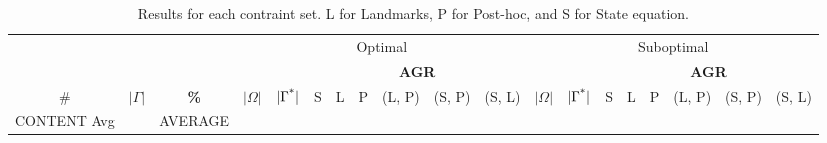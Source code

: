 \documentclass[letterpaper]{article}
\begin{document}
\begin{table*}[]
\centering
\fontsize{4}{6}\selectfont
\setlength\tabcolsep{1.5pt}
\begin{tabular}{ccccccccccccccccccc}
\toprule
 & & & \multicolumn{8}{c}{Optimal} & \multicolumn{8}{c}{Suboptimal}\\
\cmidrule(lr){4-11}\cmidrule(lr){12-19}
 & & & & & \multicolumn{6}{c}{\textbf{AGR}} & & & \multicolumn{6}{c}{\textbf{AGR}}\\
\cline{6-11} \cline{14-19}
\# & $|\Gamma|$ & \textbf{\%} & $|\Omega|$ & $|\Gamma^\textup{*}|$ & S & L & P & (L, P) & (S, P) & (S, L) & $|\Omega|$ & $|\Gamma^\textup{*}|$ & S & L & P & (L, P) & (S, P) & (S, L)\\
\midrule
CONTENT
Avg & & AVERAGE\\
\bottomrule
\end{tabular}\\
\caption{Results for each contraint set. L for Landmarks, P for Post-hoc, and S for State equation.}
\end{table*}
\end{document}
